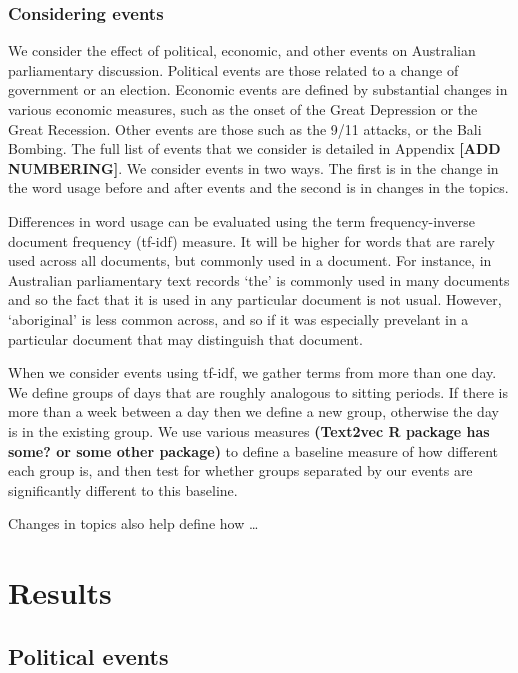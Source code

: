 \documentclass[12pt,]{article}
\theoremstyle{definition}
\theoremstyle{definition}
\theoremstyle{definition}
\theoremstyle{remark}
\begin{document}
\subsubsection{Considering events}\label{considering-events}

We consider the effect of political, economic, and other events on
Australian parliamentary discussion. Political events are those related
to a change of government or an election. Economic events are defined by
substantial changes in various economic measures, such as the onset of
the Great Depression or the Great Recession. Other events are those such
as the 9/11 attacks, or the Bali Bombing. The full list of events that
we consider is detailed in Appendix \textbf{{[}ADD NUMBERING{]}}. We
consider events in two ways. The first is in the change in the word
usage before and after events and the second is in changes in the
topics.

Differences in word usage can be evaluated using the term
frequency-inverse document frequency (tf-idf) measure. It will be higher
for words that are rarely used across all documents, but commonly used
in a document. For instance, in Australian parliamentary text records
`the' is commonly used in many documents and so the fact that it is used
in any particular document is not usual. However, `aboriginal' is less
common across, and so if it was especially prevelant in a particular
document that may distinguish that document.

When we consider events using tf-idf, we gather terms from more than one
day. We define groups of days that are roughly analogous to sitting
periods. If there is more than a week between a day then we define a new
group, otherwise the day is in the existing group. We use various
measures \textbf{(Text2vec R package has some? or some other package)}
to define a baseline measure of how different each group is, and then
test for whether groups separated by our events are significantly
different to this baseline.

Changes in topics also help define how \ldots{}

\section{Results}\label{results}

\subsection{Political events}\label{political-events}
\end{document}
